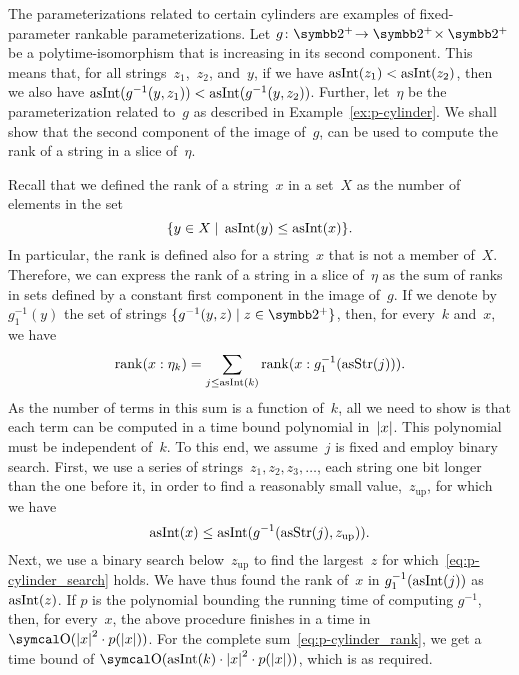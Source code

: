 \begin{example}
\label{ex:fp-rankable}%
  The parameterizations related to certain \pdash{}cylinders are examples of fixed-parameter \pdash{}rankable parameterizations.
  Let $g\colon \binary^+\! \to \binary^+\! \times \binary^+$ be a polytime-isomorphism that is increasing in its second component.
  This means that, for all strings~$z_1$,~$z_2$, and~$y$, if we have $\operatorname{asInt}(z_1) < \operatorname{asInt}(z_2)$, then we also have $\operatorname{asInt}(g^{-1}(y, z_1)) < \operatorname{asInt}(g^{-1}(y, z_2))$.
  Further, let~$\eta$ be the parameterization related to~$g$ as described in Example~\ref{ex:p-cylinder}.
  We shall show that the second component of the image of~$g$, can be used to compute the rank of a string in a slice of~$\eta$.

  Recall that we defined the rank of a string~$x$ in a set~$X$ as the number of elements in the set
  \begin{equation*}
    \{y \in X \;|\; \operatorname{asInt}(y) \le \operatorname{asInt}(x)\}.
  \end{equation*}
  In particular, the rank is defined also for a string~$x$ that is not a member of~$X$.
  Therefore, we can express the rank of a string in a slice of~$\eta$ as the sum of ranks in sets defined by a constant first component in the image of~$g$.
  If we denote by $g_1^{-1}(y)$ the set of strings $\{g^{-1}(y, z) \st z \in \binary^+\}$, then, for every~$k$ and~$x$, we have
  \begin{equation}
  \label{eq:p-cylinder_rank}
    \operatorname{rank}(x : \eta_k) = \sum_{j \le \operatorname{asInt}(k)} \operatorname{rank}(x : g_1^{-1}(\operatorname{asStr}(j))).
  \end{equation}
  As the number of terms in this sum is a function of~$k$, all we need to show is that each term can be computed in a time bound polynomial in~${\lvert x\rvert}$.
  This polynomial must be independent of~$k$.
  To this end, we assume~$j$ is fixed and employ binary search.
  First, we use a series of strings~$z_1, z_2, z_3, \ldots$, each string one bit longer than the one before it, in order to find a reasonably small value,~$z_\mathrm{up}$, for which we have
  \begin{equation}
  \label{eq:p-cylinder_search}
    \operatorname{asInt}(x) \le \operatorname{asInt}(g^{-1}(\operatorname{asStr}(j), z_\mathrm{up})).
  \end{equation}
  Next, we use a binary search below~$z_\mathrm{up}$ to find the largest~$z$ for which~\eqref{eq:p-cylinder_search} holds.
  We have thus found the rank of~$x$ in $g_1^{-1}(\operatorname{asInt}(j))$ as $\operatorname{asInt}(z)$.
  If $p$ is the polynomial bounding the running time of computing $g^{-1}$, then, for every~$x$, the above procedure finishes in a time in $\bigO(\length{x}^2 \cdot p(\length{x}))$.
  For the complete sum~\eqref{eq:p-cylinder_rank}, we get a time bound of $\bigO(\asNat(k) \cdot \length{x}^2 \cdot p(\length{x}))$, which is as required.
\end{example}

